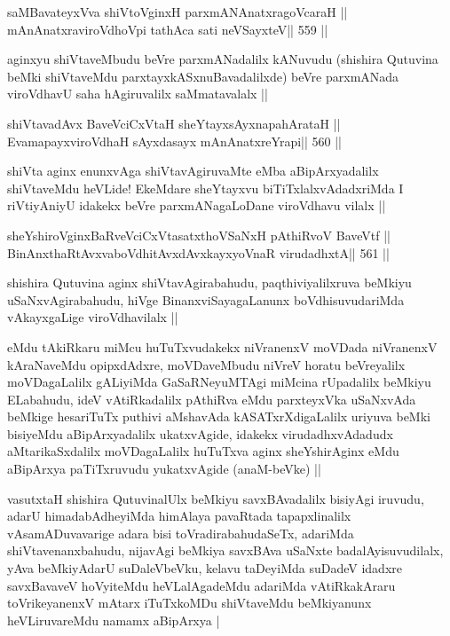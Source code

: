 \begin{shl}
saMBavateyxVva shiVtoV\s ginxH parxmANAnatxragoVcaraH ||
mAnAnatxraviroVdhoV\s pi tathAca sati neVSayxteV\hfill || 559 ||
\end{shl}

\begin{artha}
aginxyu shiVtaveMbudu beVre parxmANadalilx kANuvudu (shishira Qutuvina
beMki shiVtaveMdu parxtayxkASxnuBavadalilxde) beVre parxmANada
viroVdhavU saha hAgiruvalilx saMmatavalalx ||
\end{artha}

\begin{shl}
shiVtavadAvx BaveVciCxVtaH sheYtayxsAyxnapahArataH ||
EvamapayxviroVdhaH sAyxdasayx mAnAnatxreYrapi\hfill || 560 ||
\end{shl}

\begin{artha}
shiVta aginx enunxvAga shiVtavAgiruvaMte eMba aBipArxyadalilx
shiVtaveMdu heVLide! EkeMdare sheYtayxvu biTiTxlalxvAdadxriMda I
riVtiyAniyU idakekx beVre parxmANagaLoDane viroVdhavu vilalx ||
\end{artha}

\begin{shl}
sheYshiroV\s ginxBaRveVciCxVtasatxthoVSaNxH pAthiRvoV BaveVtf ||
BinAnxthaRtAvxvaboVdhitAvxdAvxkayxyoVnaR virudadhxtA\hfill || 561 ||
\end{shl}

\begin{artha}
shishira Qutuvina aginx shiVtavAgirabahudu, paqthiviyalilxruva beMkiyu
uSaNxvAgirabahudu, hiVge BinanxviSayagaLanunx boVdhisuvudariMda
vAkayxgaLige viroVdhavilalx ||
\end{artha}

\begin{artha}
eMdu tAkiRkaru miMcu huTuTxvudakekx niVranenxV moVDada niVranenxV
kAraNaveMdu opipxdAdxre, moVDaveMbudu niVreV horatu beVreyalilx
moVDagaLalilx gALiyiMda GaSaRNeyuMTAgi miMcina rUpadalilx beMkiyu
ELabahudu, ideV vAtiRkadalilx pAthiRva eMdu parxteyxVka uSaNxvAda
beMkige hesariTuTx puthivi aMshavAda kASATxrXdigaLalilx uriyuva beMki
bisiyeMdu aBipArxyadalilx ukatxvAgide, idakekx virudadhxvAdadudx
aMtarikaSxdalilx moVDagaLalilx huTuTxva aginx sheYshirAginx eMdu
aBipArxya paTiTxruvudu yukatxvAgide (anaM-beVke) ||
\end{artha}

\begin{artha}
vasutxtaH shishira QutuvinalUlx beMkiyu savxBAvadalilx bisiyAgi
iruvudu, adarU himadabAdheyiMda himAlaya pavaRtada tapapxlinalilx
vAsamADuvavarige adara bisi toVradirabahudaSeTx, adariMda
shiVtavenanxbahudu, nijavAgi beMkiya savxBAva uSaNxte
badalAyisuvudilalx, yAva beMkiyAdarU suDaleVbeVku, kelavu taDeyiMda
suDadeV idadxre savxBavaveV hoVyiteMdu heVLalAgadeMdu adariMda
vAtiRkakAraru toVrikeyanenxV mAtarx iTuTxkoMDu shiVtaveMdu beMkiyanunx
heVLiruvareMdu namamx aBipArxya |
\end{artha}

